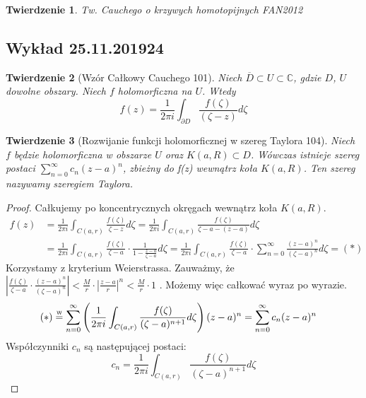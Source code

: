 \documentclass{article}
\theoremstyle{plain}
\newtheorem*{theorem}{Twierdzenie}
\theoremstyle{definition}
\theoremstyle{remark}
\newcommand{\abs}[1]{\left|#1\right|} %
\newcommand{\closure}[1]{\overline{#1}} %
\newcommand{\eqtext}[1]{\overset{\text{\tiny\sffamily #1}}{=}} %
\begin{document}
\begin{theorem}{Tw. Cauchego o krzywych homotopijnych FAN2012}

\end{theorem}

\subsection{Wykład 25.11.2019{24}}


\begin{theorem}[Wzór Całkowy Cauchego 101]
Niech $ \closure{D} \subset U \subset \mathbb{C} $, gdzie $ D $, $ U $ dowolne obszary.
  Niech $ f $ holomorficzna na $ U $.
  Wtedy
  \[
  f(z) = \frac{1}{2 \pi i} \int_{\partial D} \frac{f(\zeta)}{(\zeta - z)} d\zeta 
  \]
\end{theorem}

\begin{theorem}[Rozwijanie funkcji holomorficznej w szereg Taylora 104]
  Niech $ f $ będzie holomorficzna w obszarze $ U $ oraz $ K(a, R) \subset D $. Wówczas istnieje szereg postaci $ \sum_{n = 0}^{\infty} c_{n}(z-a)^{n} $, zbieżny do f(z) wewnątrz koła $ K(a, R) $. Ten szereg nazywamy szeregiem Taylora.
\end{theorem}

\begin{proof}
  Całkujemy po koncentrycznych okręgach wewnątrz koła $ K(a, R) $.
  \begin{align*}
    f(z) &
    = \frac{1}{2 \pi i} \int_{C(a, r)} \frac{f(\zeta)}{\zeta-z} d\zeta
    = \frac{1}{2 \pi i} \int_{C(a, r)} \frac{f(\zeta)}{\zeta-a-(z-a)} d\zeta \\ &
    = \frac{1}{2 \pi i} \int_{C(a, r)} \frac{f(\zeta)}{\zeta-a} \cdot \frac{1}{1 - \frac{z-a}{\zeta-a}} d\zeta
    = \frac{1}{2 \pi i} \int_{C(a, r)} \frac{f(\zeta)}{\zeta-a} \cdot \sum_{n=0}^{\infty} \frac{(z-a)^{n}}{(\zeta-a)^{n}} d\zeta = (*)
  \end{align*}
  Korzystamy z kryterium Weierstrassa. Zauważmy, że
  $
    \abs{\frac{f(\zeta)}{\zeta-a} \cdot \frac{(z-a)^{n}}{(\zeta-a)^{n}}}
    < \frac{M}{r} \cdot \abs{\frac{z-a}{r}}^n
    < \frac{M}{r} \cdot 1
  $
  . Możemy więc całkować wyraz po wyrazie.
  \begin{align*}
    (*) &
    \eqtext{W} \sum_{n=0}^{\infty} \left( \frac{1}{2 \pi i} \int_{C(a, r)} \frac{f(\zeta)}{(\zeta-a)^{n+1}} d\zeta \right)(z-a)^{n}
    = \sum_{n = 0}^{\infty} c_{n}(z-a)^{n}
  \end{align*}
  Współczynniki $ c_{n} $ są następującej postaci:
  $$
    c_{n} = \frac{1}{2 \pi i} \int_{C(a, r)} \frac{f(\zeta)}{(\zeta-a)^{n+1}} d\zeta
  $$
\end{proof}
\end{document}
